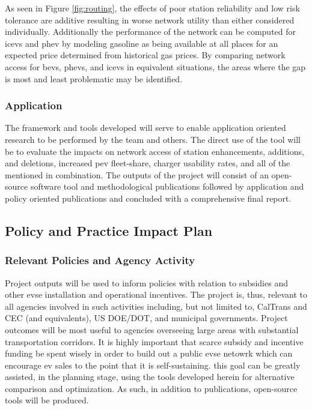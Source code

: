 \documentclass[12pt]{article}
\begin{document}
As seen in Figure \ref{fig:routing}, the effects of poor station reliability and low risk tolerance are additive resulting in worse network utility than either considered individually. Additionally the performance of the network can be computed for \glspl{icev} and \gls{phev} by modeling gasoline as being available at all places for an expected price determined from historical gas prices. By comparing network access for \glspl{bev}, \glspl{phev}, and \glspl{icev} in equivalent situations, the areas where the gap is most and least problematic may be identified.

\subsubsection*{Application}

The framework and tools developed will serve to enable application oriented research to be performed by the team and others. The direct use of the tool will be to evaluate the impacts on network access of station enhancements, additions, and deletions, increased \gls{pev} fleet-share, charger usability rates, and all of the mentioned in combination. The outputs of the project will consist of an open-source software tool and methodological publications followed by application and policy oriented publications and concluded with a comprehensive final report.

\subsection*{Policy and Practice Impact Plan}

\subsubsection*{Relevant Policies and Agency Activity}

Project outputs will be used to inform policies with relation to subsidies and other \gls{evse} installation and operational incentives. The project is, thus, relevant to all agencies involved in such activities including, but not limited to, CalTrans and CEC (and equivalents), US DOE/DOT, and municipal governments. Project outcomes will be most useful to agencies overseeing large areas with substantial transportation corridors. It is highly important that scarce subsidy and incentive funding be spent wisely in order to build out a public \gls{evse} netowrk which can encourage \gls{ev} sales to the point that it is self-sustaining. this goal can be greatly assisted, in the planning stage, using the tools developed herein for alternative comparison and optimization. As such, in addition to publications, open-source tools will be produced.
\end{document}
